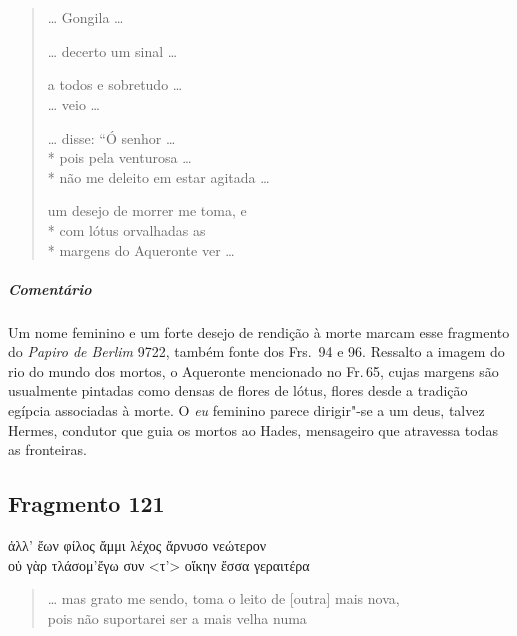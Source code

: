\pagebreak
\chapter*{}
\section*{}
\begin{verse}
\ldots{} Gongila \ldots{}

\ldots{} decerto um sinal \ldots{}

a todos e sobretudo \ldots{}\\
\ldots{} veio \ldots{}

\ldots{} disse: ``Ó senhor \ldots{}\\*
pois pela venturosa \ldots{}\\*
não me deleito em estar agitada \ldots{}

um desejo de morrer me toma, e\\*
com lótus orvalhadas as\\*
margens do Aqueronte ver \ldots{}
\end{verse}

\medskip

{\paragraph{Comentário} Um nome feminino e um forte desejo de rendição à morte marcam esse fragmento do
\textit{Papiro de Berlim }9722, também fonte dos Frs.~94 e 96. Ressalto a imagem do
rio do mundo dos mortos, o Aqueronte mencionado no Fr.\,65, cujas margens são usualmente pintadas
como densas de flores de lótus, flores desde a tradição egípcia associadas à morte. O \textit{eu} feminino parece dirigir"-se a um deus,
talvez Hermes, condutor que guia os mortos ao Hades, mensageiro que atravessa todas as fronteiras.}

\pagebreak
\section{Fragmento 121}

\begin{gkverse}
ἀλλ’ ἔων φίλος ἄμμι λέχος ἄρνυσο νεώτερον\\
οὐ γὰρ τλάσομ’ἔγω συν <τ’> οἴκην ἔσσα γεραιτέρα
\end{gkverse}

\begin{verse}
\ldots{} mas grato me sendo, toma o leito de [outra] mais nova,\\
pois não suportarei ser a mais velha numa 
\end{verse}

